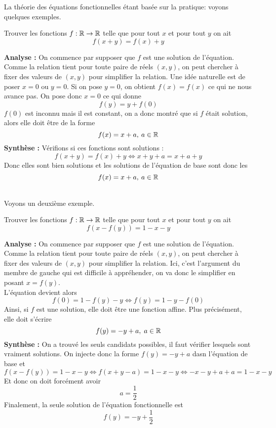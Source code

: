La théorie des équations fonctionnelles étant basée sur la pratique: voyons quelques exemples.
\begin{ex}
Trouver les fonctions $f:\mathbb R\to \mathbb R$ telle que pour tout $x$ et pour tout $y$ on ait
$$f(x+y)=f(x)+y $$
\end{ex}
\begin{preuve}
\textbf{Analyse :}
On commence par supposer que $f$ est une solution de l'équation.
\\

Comme la relation tient pour toute paire de réels $(x,y)$, on peut chercher à fixer des valeurs de $(x,y)$ pour simplifier la relation. Une idée naturelle est de poser $x=0$ ou $y=0$. Si on pose $y=0$, on obtient $f(x)=f(x)$ ce qui ne nous avance pas. On pose donc $x=0$ ce qui donne
$$f(y)=y+f(0) $$
$f(0)$ est inconnu mais il est constant, on a donc montré que si $f$ était solution, alors elle doit être de la forme
$$f(x)=x+a, \: a\in \mathbb R $$
\textbf{Synthèse :} Vérifions si ces fonctions sont solutions :
$$f(x+y)=f(x)+y\iff x+y+a=x+a+y $$
Donc elles sont bien solutions et les solutions de l'équation de base sont donc les
$$f(x)=x+a, \: a\in \mathbb R $$
\end{preuve}
\\
Voyons un deuxième exemple.
\begin{ex}
Trouver les fonctions $f:\mathbb R\to \mathbb R$ telle que pour tout $x$ et pour tout $y$ on ait
$$f(x-f(y))=1-x-y $$
\end{ex}

\begin{preuve}
\textbf{Analyse :}
On commence par supposer que $f$ est une solution de l'équation.
\\

Comme la relation tient pour toute paire de réels $(x,y)$, on peut chercher à fixer des valeurs de $(x,y)$ pour simplifier la relation. Ici, c'est l'argument du membre de gauche qui est difficile à appréhender, on va donc le simplifier en posant $x=f(y)$.
\\
L'équation devient alors
$$f(0)=1-f(y)-y\iff f(y)=1-y-f(0) $$
Ainsi, si $f$ est une solution, elle doit être une fonction affine. Plus précisément, elle doit s'écrire
$$f(y)=-y+a, \; a\in \mathbb R $$
\textbf{Synthèse :}
On a trouvé les seuls candidats possibles, il faut vérifier lesquels sont vraiment solutions. On injecte donc la forme $f(y)=-y+a$ dasn l'équation de base et
$$f(x-f(y))=1-x-y\iff f(x+y-a)=1-x-y\iff -x-y+a+a=1-x-y $$
Et donc on doit forcément avoir
$$a=\frac{1}{2} $$
Finalement, la seule solution de l'équation fonctionnelle est
$$f(y)=-y+\frac{1}{2} $$
\end{preuve}


